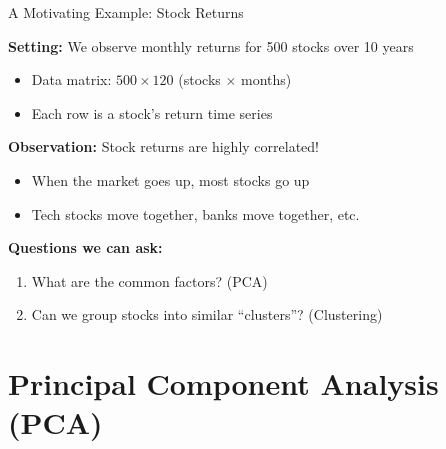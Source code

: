 \documentclass[10pt]{beamer}
\begin{document}
\begin{frame}{A Motivating Example: Stock Returns}

  \textbf{Setting:} We observe monthly returns for 500 stocks over 10 years

  \vspace{0.5em}
  \begin{itemize}
    \item Data matrix: $500 \times 120$ (stocks $\times$ months)
    \item Each row is a stock's return time series
  \end{itemize}

  \vspace{1em}
  \textbf{Observation:} Stock returns are highly correlated!
  \begin{itemize}
    \item When the market goes up, most stocks go up
    \item Tech stocks move together, banks move together, etc.
  \end{itemize}

  \vspace{1em}
  \textbf{Questions we can ask:}
  \begin{enumerate}
    \item What are the common factors? (PCA)
    \item Can we group stocks into similar ``clusters''? (Clustering)
  \end{enumerate}
\end{frame}

\section{Principal Component Analysis (PCA)}
\end{document}
